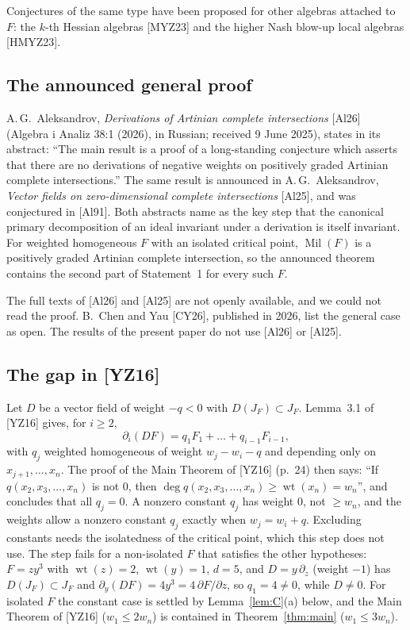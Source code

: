 \documentclass[11pt]{article}
\newcommand{\Mil}{\operatorname{Mil}(F)}
\theoremstyle{remark}
\begin{document}
\smallskip
Conjectures of the same type have been proposed for other algebras attached to $F$: the $k$-th Hessian algebras [MYZ23] and the higher Nash blow-up local algebras [HMYZ23].

\subsection{The announced general proof}

A.\,G.~Aleksandrov, \emph{Derivations of Artinian complete intersections} [Al26] (Algebra i Analiz 38:1 (2026), in Russian; received 9 June 2025), states in its abstract: ``The main result is a proof of a long-standing conjecture which asserts that there are no derivations of negative weights on positively graded Artinian complete intersections.'' The same result is announced in A.\,G.~Aleksandrov, \emph{Vector fields on zero-dimensional complete intersections} [Al25], and was conjectured in [Al91]. Both abstracts name as the key step that the canonical primary decomposition of an ideal invariant under a derivation is itself invariant. For weighted homogeneous $F$ with an isolated critical point, $\Mil$ is a positively graded Artinian complete intersection, so the announced theorem contains the second part of Statement~1 for every such $F$.

The full texts of [Al26] and [Al25] are not openly available, and we could not read the proof. B.~Chen and Yau [CY26], published in 2026, list the general case as open. The results of the present paper do not use [Al26] or [Al25].

\subsection{The gap in [YZ16]}

Let $D$ be a vector field of weight $-q<0$ with $D(J_F)\subset J_F$. Lemma~3.1 of [YZ16] gives, for $i\ge2$,
\[
\partial_i(DF)=q_1F_1+\dots+q_{i-1}F_{i-1},
\]
with $q_j$ weighted homogeneous of weight $w_j-w_i-q$ and depending only on $x_{j+1},\dots,x_n$. The proof of the Main Theorem of [YZ16] (p.~24) then says: ``If $q(x_2,x_3,\dots,x_n)$ is not $0$, then $\deg q(x_2,x_3,\dots,x_n)\ge\operatorname{wt}(x_n)=w_n$'', and concludes that all $q_j=0$. A nonzero constant $q_j$ has weight $0$, not $\ge w_n$, and the weights allow a nonzero constant $q_j$ exactly when $w_j=w_i+q$. Excluding constants needs the isolatedness of the critical point, which this step does not use. The step fails for a non-isolated $F$ that satisfies the other hypotheses: $F=zy^3$ with $\operatorname{wt}(z)=2$, $\operatorname{wt}(y)=1$, $d=5$, and $D=y\,\partial_z$ (weight $-1$) has $D(J_F)\subset J_F$ and $\partial_y(DF)=4y^3=4\,\partial F/\partial z$, so $q_1=4\ne0$, while $D\ne0$. For isolated $F$ the constant case is settled by Lemma~\ref{lem:C}(a) below, and the Main Theorem of [YZ16] ($w_1\le2w_n$) is contained in Theorem~\ref{thm:main} ($w_1\le3w_n$).
\end{document}
